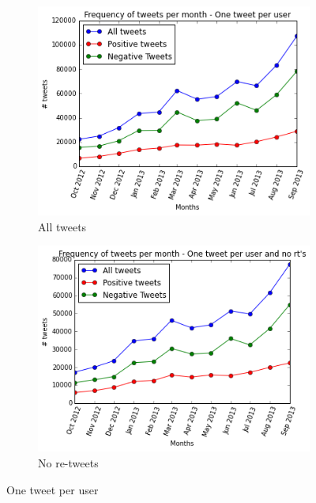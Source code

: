 \documentclass{sig-alternate}
\begin{document}
\begin{figure}
\begin{subfigure}{\columnwidth}
  \includegraphics[width=\columnwidth]{one_per_user.png}
  \caption{All tweets}
  \label{figura:one}
\end{subfigure}%
\begin{subfigure}{\columnwidth}
  \centering
  \includegraphics[width=\columnwidth]{no_rts.png}
  \caption{No re-tweets}
  \label{figura:no_rt}
\end{subfigure}%
\caption{One tweet per user}
\end{figure}
\end{document}
